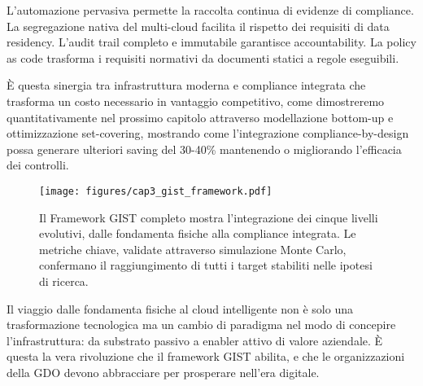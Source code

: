 \documentclass[12pt,a4paper,twoside]{book}
\begin{document}
L'automazione pervasiva permette la raccolta continua di evidenze di compliance. La segregazione nativa del multi-cloud facilita il rispetto dei requisiti di data residency. L'audit trail completo e immutabile garantisce accountability. La policy as code trasforma i requisiti normativi da documenti statici a regole eseguibili.

È questa sinergia tra infrastruttura moderna e compliance integrata che trasforma un costo necessario in vantaggio competitivo, come dimostreremo quantitativamente nel prossimo capitolo attraverso modellazione bottom-up e ottimizzazione set-covering, mostrando come l'integrazione compliance-by-design possa generare ulteriori saving del 30-40\% mantenendo o migliorando l'efficacia dei controlli.

\begin{figure}[htbp]
\centering
\texttt{[image: figures/cap3\_gist\_framework.pdf]}
\caption{Il Framework GIST completo mostra l'integrazione dei cinque livelli evolutivi, dalle fondamenta fisiche alla compliance integrata. Le metriche chiave, validate attraverso simulazione Monte Carlo, confermano il raggiungimento di tutti i target stabiliti nelle ipotesi di ricerca.}
\label{fig:gist_complete}
\end{figure}

Il viaggio dalle fondamenta fisiche al cloud intelligente non è solo una trasformazione tecnologica ma un cambio di paradigma nel modo di concepire l'infrastruttura: da substrato passivo a enabler attivo di valore aziendale. È questa la vera rivoluzione che il framework GIST abilita, e che le organizzazioni della GDO devono abbracciare per prosperare nell'era digitale.

\clearpage
\printbibliography[
    heading=subbibliography,
    title={Riferimenti Bibliografici del Capitolo 3},
]
\end{document}
